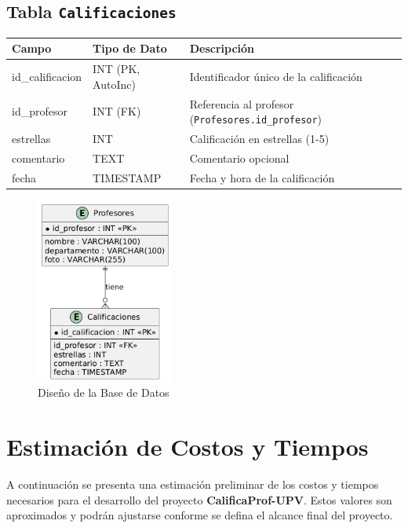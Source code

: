 \documentclass[11pt]{article}
\begin{document}
\subsection{Tabla \texttt{Calificaciones}}
\begin{center}
\begin{tabularx}{\textwidth}{@{}p{4cm}p{3cm}X@{}}
\toprule
\textbf{Campo} & \textbf{Tipo de Dato} & \textbf{Descripción} \\ \midrule
id\_calificacion & INT (PK, AutoInc) & Identificador único de la calificación \\
id\_profesor   & INT (FK)           & Referencia al profesor (\texttt{Profesores.id\_profesor}) \\
estrellas      & INT                & Calificación en estrellas (1-5) \\
comentario     & TEXT               & Comentario opcional \\
fecha          & TIMESTAMP          & Fecha y hora de la calificación \\ \bottomrule
\end{tabularx}
\end{center}

\begin{figure}[h]
    \centering
    \includegraphics[width=0.4\textwidth]{BD.png}
    \caption{Diseño de la Base de Datos}
\end{figure}

\newpage
\section{Estimación de Costos y Tiempos}

A continuación se presenta una estimación preliminar de los costos y tiempos necesarios para el desarrollo del proyecto \textbf{CalificaProf-UPV}. Estos valores son aproximados y podrán ajustarse conforme se defina el alcance final del proyecto.
\end{document}
